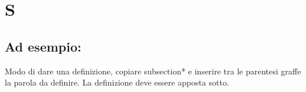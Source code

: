 \section*{S}
\markright{}
\subsection*{Ad esempio:}
Modo di dare una definizione, copiare subsection*{} e inserire tra le parentesi graffe la parola da definire. La definizione deve essere apposta sotto.
